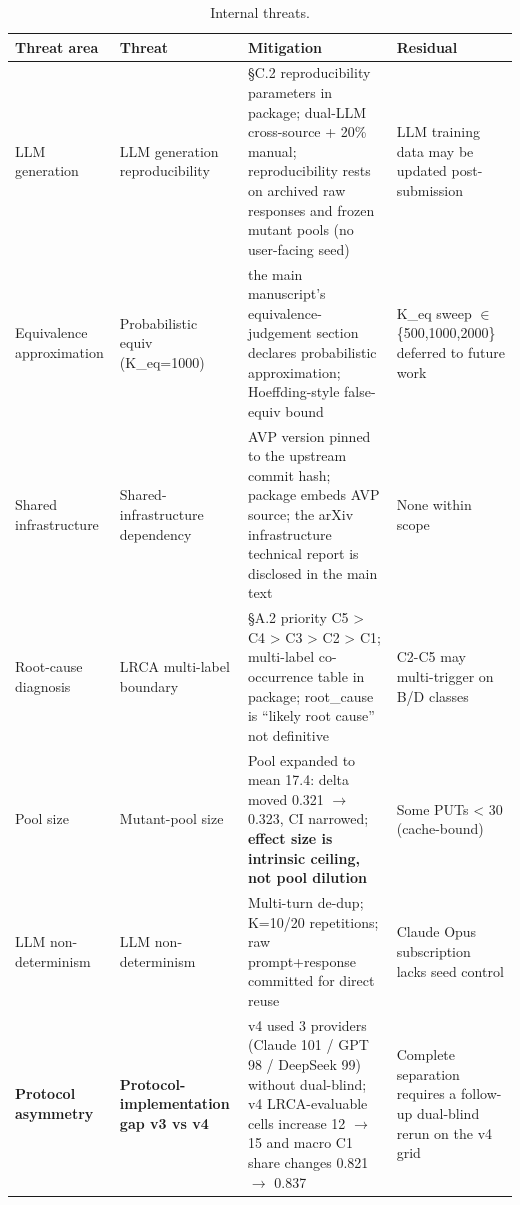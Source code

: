 \documentclass[review,12pt,authoryear]{elsarticle}
\begin{document}
{\def\LTcaptype{table} %
\begin{longtable}[]{@{}
  >{\raggedright\arraybackslash}p{}
  >{\raggedright\arraybackslash}p{}
  >{\raggedright\arraybackslash}p{}
  >{\raggedright\arraybackslash}p{}@{}}
\caption{Internal threats.}\label{tab:p2-27}\\
\toprule\noalign{}
\begin{minipage}[b]{\linewidth}\raggedright
Threat area
\end{minipage} & \begin{minipage}[b]{\linewidth}\raggedright
Threat
\end{minipage} & \begin{minipage}[b]{\linewidth}\raggedright
Mitigation
\end{minipage} & \begin{minipage}[b]{\linewidth}\raggedright
Residual
\end{minipage} \\
\midrule\noalign{}
\endfirsthead
\endhead
\bottomrule\noalign{}
\endlastfoot
LLM generation & LLM generation reproducibility & §C.2 reproducibility parameters in
package; dual-LLM cross-source + 20\% manual; reproducibility rests on
archived raw responses and frozen mutant pools (no user-facing seed) & LLM training data may be updated
post-submission \\
Equivalence approximation & Probabilistic equiv (K\_eq=1000) & the main manuscript's equivalence-judgement section declares probabilistic
approximation; Hoeffding-style false-equiv bound & K\_eq sweep $\in$
\{500,1000,2000\} deferred to future work \\
Shared infrastructure & Shared-infrastructure dependency & AVP version pinned to the upstream commit hash;
package embeds AVP source; the arXiv infrastructure technical report is disclosed in the main text &
None within scope \\
Root-cause diagnosis & LRCA multi-label boundary & §A.2 priority
C5 \textgreater{} C4 \textgreater{} C3 \textgreater{} C2 \textgreater{} C1;
multi-label co-occurrence table in package; root\_cause is ``likely root
cause'' not definitive & C2-C5 may multi-trigger on B/D classes \\
Pool size & Mutant-pool size & Pool expanded to mean 17.4: delta moved 0.321 $\to$
0.323, CI narrowed; \textbf{effect size is intrinsic ceiling, not pool
dilution} & Some PUTs \textless{} 30 (cache-bound) \\
LLM non-determinism & LLM non-determinism & Multi-turn de-dup; K=10/20 repetitions; raw
prompt+response committed for direct reuse & Claude Opus subscription
lacks seed control \\
\textbf{Protocol asymmetry} & \textbf{Protocol-implementation gap v3 vs v4} & v4 used 3
providers (Claude 101 / GPT 98 / DeepSeek 99) without dual-blind; v4
LRCA-evaluable cells increase 12 $\to$ 15 and macro C1 share changes
0.821 $\to$ 0.837 & Complete separation requires a follow-up dual-blind rerun on
the v4 grid \\
\end{longtable}
}
\end{document}
